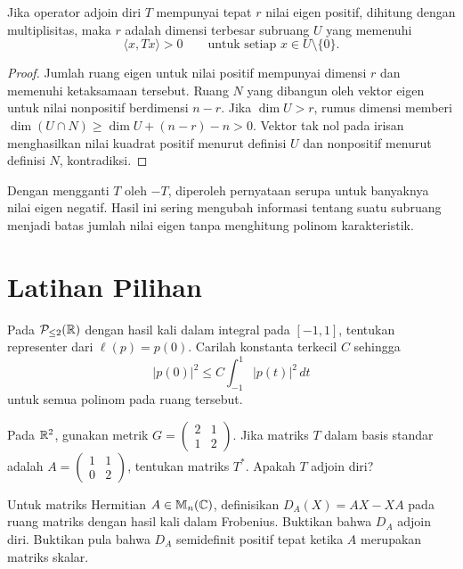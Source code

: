 \begin{teorema}
    Jika operator adjoin diri $T$ mempunyai tepat $r$ nilai
    eigen positif, dihitung dengan multiplisitas, maka $r$
    adalah dimensi terbesar subruang $U$ yang memenuhi
    \[
        \langle x,Tx\rangle>0\qquad\text{untuk setiap }x\in U\setminus\{0\}.
    \]
\end{teorema}
\begin{proof}
    Jumlah ruang eigen untuk nilai positif mempunyai dimensi $r$
    dan memenuhi ketaksamaan tersebut.
    Ruang $N$ yang dibangun oleh vektor eigen untuk nilai
    nonpositif berdimensi $n-r$.
    Jika $\dim U>r$, rumus dimensi memberi
    $\dim(U\cap N)\ge\dim U+(n-r)-n>0$.
    Vektor tak nol pada irisan menghasilkan nilai kuadrat
    positif menurut definisi $U$ dan nonpositif menurut definisi
    $N$, kontradiksi.
\end{proof}

Dengan mengganti $T$ oleh $-T$, diperoleh pernyataan serupa
untuk banyaknya nilai eigen negatif. Hasil ini sering mengubah
informasi tentang suatu subruang menjadi batas jumlah nilai
eigen tanpa menghitung polinom karakteristik.

\section{Latihan Pilihan}

\begin{latihan}\label{op:lat-riesz}
    Pada $\mathcal P_{\le2}(\mathbb{R})$ dengan hasil kali dalam integral
    pada $[-1,1]$, tentukan representer dari $\ell(p)=p(0)$.
    Carilah konstanta terkecil $C$ sehingga
    \[
        |p(0)|^2\le C\int_{-1}^1|p(t)|^2\,dt
    \]
    untuk semua polinom pada ruang tersebut.
\end{latihan}

\begin{latihan}\label{op:lat-adjoin-berbobot}
    Pada $\mathbb{R}^2$, gunakan metrik $G=\begin{pmatrix}2&1\\1&2\end{pmatrix}$.
    Jika matriks $T$ dalam basis standar adalah
    $A=\begin{pmatrix}1&1\\0&2\end{pmatrix}$, tentukan matriks
    $T^*$. Apakah $T$ adjoin diri?
\end{latihan}

\begin{latihan}\label{op:lat-komutator}
    Untuk matriks Hermitian $A\in\mathbb{M}_n(\mathbb{C})$, definisikan
    $D_A(X)=AX-XA$ pada ruang matriks dengan hasil kali dalam
    Frobenius. Buktikan bahwa $D_A$ adjoin diri.
    Buktikan pula bahwa $D_A$ semidefinit positif tepat ketika
    $A$ merupakan matriks skalar.
\end{latihan}

